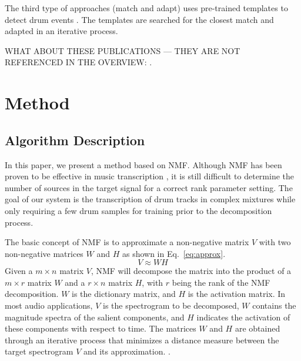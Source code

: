 \documentclass{article}
\begin{document}
The third type of approaches (match and adapt) uses pre-trained templates to detect drum events \cite{yoshii_automatic_2004, yoshii_drum_2007}. The templates are searched for the closest match and adapted in an iterative process. %
 
WHAT ABOUT THESE PUBLICATIONS --- THEY ARE NOT REFERENCED IN THE OVERVIEW: \cite{scholler_sparse_2011}.

\section{Method}\label{sec:method}
\subsection{Algorithm Description}\label{subsec:algorithm description}

In this paper, we present a method based on NMF. Although NMF has been proven to be effective in music transcription \cite{smaragdis_non-negative_2003}, it is still difficult to determine the number of sources in the target signal for a correct rank parameter setting. The goal of our system is the transcription of drum tracks in complex mixtures while only requiring a few drum samples for training prior to the decomposition process. 

The basic concept of NMF is to approximate a non-negative matrix $V$ with two non-negative matrices $W$ and $H$ as shown in Eq.~\eqref{eq:approx}.
\begin{equation}
V \approx WH
\label{eq:approx}
\end{equation}
Given a $m \times n$ matrix $V$, NMF will decompose the matrix into the product of a $m \times r$ matrix $W$ and a $r \times n$ matrix $H$, with $r$ being the rank of the NMF decomposition. $W$ is the dictionary matrix, and $H$ is the activation matrix. In most audio applications, $V$ is the spectrogram to be decomposed, $W$ contains the magnitude spectra of the salient components, and $H$ indicates the activation of these components with respect to time. The matrices $W$ and $H$ are obtained through an iterative process that minimizes a distance measure between the target spectrogram $V$ and its approximation. \cite{lee_algorithms_2000}. 
\end{document}
